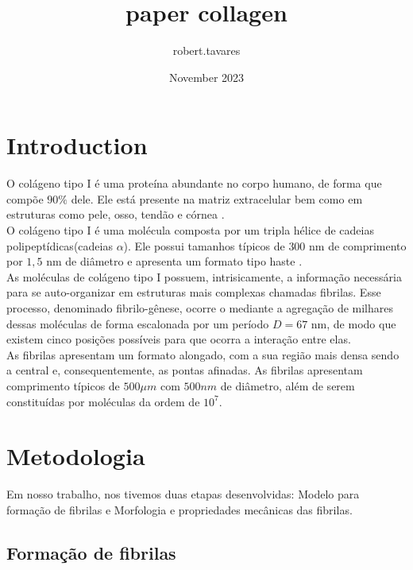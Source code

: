 \documentclass{article}
\title{paper collagen}
\author{robert.tavares}
\date{November 2023}
\begin{document}
\maketitle

\section{Introduction}

O colágeno tipo I é uma proteína abundante no corpo humano, de forma que compõe $90\%$ dele. Ele está presente na matriz extracelular bem como em estruturas como pele, osso, tendão e córnea \cite{RicoLlanos2021, Silver2018}.
\\

O colágeno tipo I é uma molécula composta por um tripla hélice de cadeias polipeptídicas(cadeias $\alpha$). Ele possui tamanhos típicos de $300$ nm de comprimento por $1,5$ nm de diâmetro e apresenta um formato tipo haste \cite{Gelse2003,Silver2018}. 
\\

As moléculas de colágeno tipo I possuem, intrisicamente, a informação necessária para se auto-organizar em estruturas mais complexas chamadas fibrilas. Esse processo, denominado fibrilo-gênese, ocorre o mediante a agregação de milhares dessas moléculas de forma escalonada por um período $D= 67$ nm, de modo que existem cinco posições possíveis para que ocorra a interação entre elas\cite{Zhu2018, KADLER1996}.  
\\

As fibrilas apresentam um formato alongado, com a sua região mais densa sendo a central e, consequentemente, as pontas afinadas\cite{Charvolin2019, KADLER1996}. As fibrilas apresentam comprimento típicos de $500 \mu m$ com $500 nm$ de diâmetro, além de serem constituídas por moléculas da ordem de $10^{7}$\cite{Parry1984}. 
\\


\section{Metodologia}


Em nosso trabalho, nos tivemos duas etapas desenvolvidas: Modelo para formação de fibrilas e Morfologia e propriedades mecânicas das fibrilas. 

\subsection{Formação de fibrilas}
\end{document}
